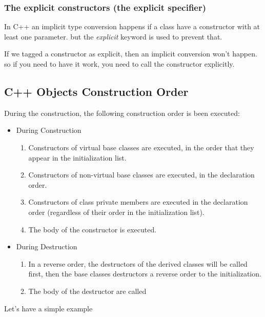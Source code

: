 \documentclass{article}
\begin{document}
\subsubsection{The explicit constructors (the explicit specifier)} \label{explicit_constructors}
In C++ an implicit type conversion happens if a class have a constructor with at least one parameter. but the \textit{explicit} keyword is used to prevent that.


If we tagged a constructor as explicit, then an implicit conversion won't happen. so if you need to have it work, you need to call the constructor explicitly.


\subsection{C++ Objects Construction Order}
During the construction, the following construction order is been executed:

\begin{itemize}
  \item During Construction
  \begin{enumerate}
    \item Constructors of virtual base classes are executed, in the order that they appear in the initialization list.
    \item Constructors of non-virtual base classes are executed, in the declaration order.
    \item Constructors of class private members are executed in the declaration order (regardless of their order in the initialization list).
    \item The body of the constructor is executed.
  \end{enumerate}

  \item During Destruction
  \begin{enumerate}
    \item In a reverse order, the destructors of the derived classes will be called first, then the base classes destructors a reverse order to the initialization.
    \item The body of the destructor are called 
  \end{enumerate}
\end{itemize}
Let's have a simple example

\end{document}
